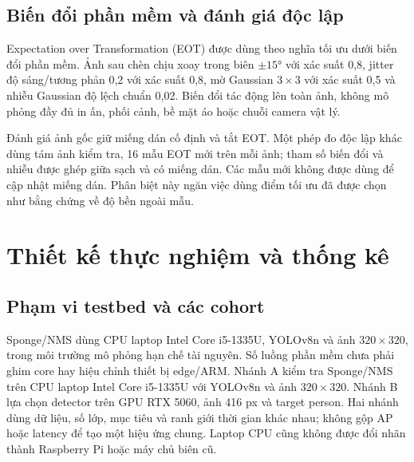 \documentclass[a4paper,fleqn]{cas-dc}
\newif\ifbranchB
\begin{document}
\subsection{Biến đổi phần mềm và đánh giá độc lập}

Expectation over Transformation (EOT) được dùng theo nghĩa tối ưu dưới biến đổi phần mềm. Ảnh sau chèn chịu xoay trong biên $\pm15°$ với xác suất 0,8, jitter độ sáng/tương phản 0,2 với xác suất 0,8, mờ Gaussian $3\times3$ với xác suất 0,5 và nhiễu Gaussian độ lệch chuẩn 0,02. Biến đổi tác động lên toàn ảnh, không mô phỏng đầy đủ in ấn, phối cảnh, bề mặt áo hoặc chuỗi camera vật lý.

Đánh giá ảnh gốc giữ miếng dán cố định và tắt EOT. Một phép đo độc lập khác dùng tám ảnh kiểm tra, 16 mẫu EOT mới trên mỗi ảnh; tham số biến đổi và nhiễu được ghép giữa sạch và có miếng dán. Các mẫu mới không được dùng để cập nhật miếng dán. Phân biệt này ngăn việc dùng điểm tối ưu đã được chọn như bằng chứng về độ bền ngoài mẫu.

\section{Thiết kế thực nghiệm và thống kê}

\subsection{Phạm vi testbed và các cohort}
Sponge/NMS dùng CPU laptop Intel Core i5-1335U, YOLOv8n và ảnh $320\times320$, trong môi trường mô phỏng hạn chế tài nguyên. Số luồng phần mềm chưa phải ghim core hay hiệu chỉnh thiết bị edge/ARM.
\ifbranchB
Nhánh A kiểm tra Sponge/NMS trên CPU laptop Intel Core i5-1335U với YOLOv8n và ảnh $320\times320$. Nhánh B lựa chọn detector trên GPU RTX 5060, ảnh 416 px và target person. Hai nhánh dùng dữ liệu, số lớp, mục tiêu và ranh giới thời gian khác nhau; không gộp AP hoặc latency để tạo một hiệu ứng chung. Laptop CPU cũng không được đổi nhãn thành Raspberry Pi hoặc máy chủ biên cũ.
\end{document}

